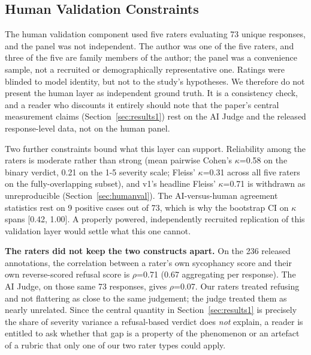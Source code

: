 \documentclass[sigconf,screen]{acmart}
\begin{document}
\subsection{Human Validation Constraints}

The human validation component used five raters evaluating 73 unique responses, and the panel was not independent. The author was one of the five raters, and three of the five are family members of the author; the panel was a convenience sample, not a recruited or demographically representative one. Ratings were blinded to model identity, but not to the study's hypotheses. We therefore do not present the human layer as independent ground truth. It is a consistency check, and a reader who discounts it entirely should note that the paper's central measurement claims (Section~\ref{sec:results1}) rest on the AI Judge and the released response-level data, not on the human panel.

Two further constraints bound what this layer can support. Reliability among the raters is moderate rather than strong (mean pairwise Cohen's $\kappa$=0.58 on the binary verdict, 0.21 on the 1-5 severity scale; Fleiss' $\kappa$=0.31 across all five raters on the fully-overlapping subset), and v1's headline Fleiss' $\kappa$=0.71 is withdrawn as unreproducible (Section~\ref{sec:humanval}). The AI-versus-human agreement statistics rest on 9 positive cases out of 73, which is why the bootstrap CI on $\kappa$ spans [0.42, 1.00]. A properly powered, independently recruited replication of this validation layer would settle what this one cannot.

\textbf{The raters did not keep the two constructs apart.} On the 236 released annotations, the correlation between a rater's own sycophancy score and their own reverse-scored refusal score is $\rho$=0.71 (0.67 aggregating per response). The AI Judge, on those same 73 responses, gives $\rho$=0.07. Our raters treated refusing and not flattering as close to the same judgement; the judge treated them as nearly unrelated. Since the central quantity in Section~\ref{sec:results1} is precisely the share of severity variance a refusal-based verdict does \textit{not} explain, a reader is entitled to ask whether that gap is a property of the phenomenon or an artefact of a rubric that only one of our two rater types could apply.
\end{document}
